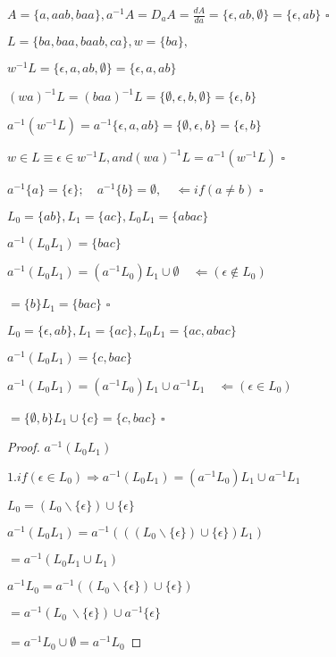 \begin{example}
$A = \{a,aab,baa\},a^{-1}A = D_{a}A = \frac{dA}{da} =\{\epsilon,ab,\emptyset\} = \{\epsilon,ab\}$ \hfill$\square$ 
\end{example}

\begin{example}
	$L = \{ba,baa,baab,ca\}, w = \{ba\},$
	
	$w^{-1}L =\{\epsilon,a,ab,\emptyset\} = \{\epsilon,a,ab\}$
	
	${(wa)}^{-1}L = {(baa)}^{-1}L = \{\emptyset,\epsilon,b,\emptyset\} = \{\epsilon,b\}$
	
	$a^{-1}(w^{-1}L) = a^{-1}\{\epsilon,a,ab\} = \{\emptyset,\epsilon,b\} = \{\epsilon,b\}$
	
	$w\in L \equiv \epsilon \in w^{-1}L,and {(wa)}^{-1}L = a^{-1}(w^{-1}L)$ \hfill$\square$ 
\end{example}

\begin{example}
	$a^{-1}\{a\} = \{\epsilon\}; \quad a^{-1}\{b\} = \emptyset,\quad\Leftarrow if (a\ne b)$ \hfill$\square$ 
\end{example}

\begin{example}
	$L_0 = \{ab\},L_1 = \{ac\}, L_0L_1 = \{abac\}$
	
	$a^{-1}(L_0L_1) = \{bac\}$
	
	$a^{-1}(L_0L_1) = (a^{-1}L_0)L_1 \cup \emptyset \quad \Leftarrow(\epsilon \notin L_0)$
	
	$= \{b\}L_1 = \{bac\}$ \hfill$\square$ 
\end{example}

\begin{example}
	$L_0 = \{\epsilon,ab\},L_1 = \{ac\}, L_0L_1 = \{ac,abac\}$
	
	$a^{-1}(L_0L_1) = \{c,bac\}$
	
	$a^{-1}(L_0L_1) = (a^{-1}L_0)L_1 \cup a^{-1}L_1 \quad\Leftarrow(\epsilon \in L_0)$
	
	$= \{\emptyset,b\}L_1 \cup \{c\} = \{c,bac\}$ \hfill$\square$ 
\end{example}

\begin{proof}
	$a^{-1}(L_0L_1)$
	
	$1. if(\epsilon \in L_0) \Rightarrow a^{-1}(L_0L_1) = (a^{-1}L_0)L_1 \cup a^{-1}L_1 $ 
	
	$L_0 = (L_0 \backslash \{\epsilon\}) \cup \{\epsilon\}$
	
	$a^{-1}(L_0L_1) = a^{-1}(((L_0 \backslash \{\epsilon\}) \cup \{\epsilon\})L_1)$
	
	$=a^{-1}(L_0L_1\cup L_1)$
	
	$a^{-1}L_0 = a^{-1}((L_0 \backslash \{\epsilon\}) \cup \{\epsilon\})$
	
	$=a^{-1}(L_0\ \backslash \{\epsilon \}) \cup a^{-1}\{\epsilon \}$
	
	$=a^{-1}L_0 \cup \emptyset = a^{-1}L_0$
\end{proof}
	

